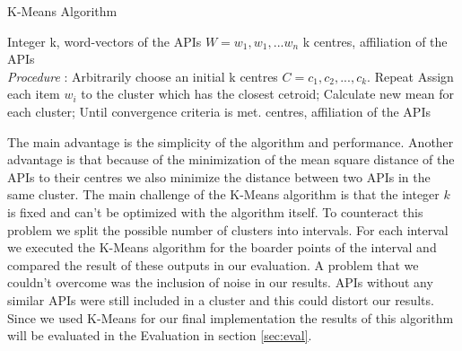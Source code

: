 \documentclass[a4paper]{IEEEtran}
\begin{document}
\begin{algorithm}[H]
\caption{K-Means Algorithm}
\label{Algorithm 3}
 \begin{algorithmic}[1]
\renewcommand{\algorithmicrequire}{\textbf{Input:}}
 \renewcommand{\algorithmicensure}{\textbf{Output:}}
 \REQUIRE Integer k, \newline word-vectors of the APIs $W={w_1, w_1, ... w_n}$
 \ENSURE  k centres, affiliation of the APIs
 \\ \textit{Procedure} :
  \STATE Arbitrarily choose an initial k centres $C = {c_1, c_2, ..., c_k}$.
 \STATE Repeat \newline
\noindent\hspace*{5mm}%
			Assign each item $w_i$ to the cluster which has \newline 
\noindent\hspace*{5mm}%
			the closest cetroid;\newline
\noindent\hspace*{5mm}%
			Calculate new mean for each cluster;\newline
	Until convergence criteria is met.
\RETURN centres, affiliation of the APIs
 \end{algorithmic}
 \end{algorithm}



The main advantage is the simplicity of the algorithm and performance. Another advantage is that because of the minimization of the mean square distance of the APIs to their centres we also minimize the distance between two APIs in the same cluster.
The main challenge of the K-Means algorithm is that the integer $k$ is fixed and can’t be optimized with the algorithm itself. To counteract this problem we split the possible number of clusters into intervals. For each interval we executed the K-Means algorithm for the boarder points of the interval and compared the result of these outputs in our evaluation.
A problem that we couldn’t overcome was the inclusion of noise in our results. APIs without any similar APIs were still included in a cluster and this could distort our results.
Since we used K-Means for our final implementation the results of this algorithm will be evaluated in the Evaluation in section \ref{sec:eval}.
\end{document}
